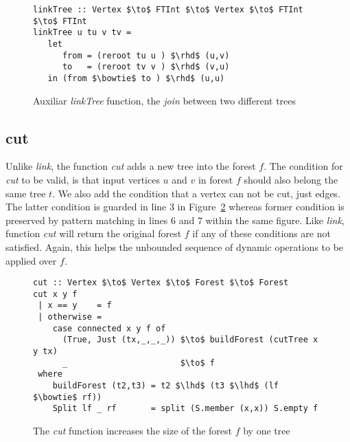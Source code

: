 \begin{figure}
\begin{lstlisting}[mathescape] 
linkTree :: Vertex $\to$ FTInt $\to$ Vertex $\to$ FTInt $\to$ FTInt 
linkTree u tu v tv =  
   let 
      from = (reroot tu u ) $\rhd$ (u,v)
      to   = (reroot tv v ) $\rhd$ (v,u) 
   in (from $\bowtie$ to ) $\rhd$ (u,u)  
\end{lstlisting} 
\caption{Auxiliar \textit{linkTree} function, the \textit{join} between two different trees}
\label{fig:linkTree}
\end{figure}



\subsection{cut}
Unlike \textit{link}, the function \textit{cut} adds a new tree into the forest $f$. The condition for \textit{cut} to be valid, is that input vertices $u$ and $v$ in forest $f$ should also belong the same tree $t$. We also add the condition that a vertex can not be cut, just edges. The latter condition is guarded in line 3 in Figure~\ref{fig:cut} whereas former condition is preserved by pattern matching in lines 6 and 7 within the same figure. Like \textit{link}, function \textit{cut} will return the original forest $f$ if any of these conditions are not satisfied. Again, this helps the unbounded sequence of dynamic operations to be applied over $f$.




\begin{figure}
\begin{lstlisting}[mathescape] 
cut :: Vertex $\to$ Vertex $\to$ Forest $\to$ Forest 
cut x y f  
 | x == y    = f  
 | otherwise = 
    case connected x y f of 
      (True, Just (tx,_,_,_)) $\to$ buildForest (cutTree x y tx) 
      _                       $\to$ f 
 where 
    buildForest (t2,t3) = t2 $\lhd$ (t3 $\lhd$ (lf $\bowtie$ rf)) 
    Split lf _ rf       = split (S.member (x,x)) S.empty f 
\end{lstlisting} 
\caption{The \textit{cut} function increases the size of the forest $f$ by one tree}
\label{fig:cut}
\end{figure}


